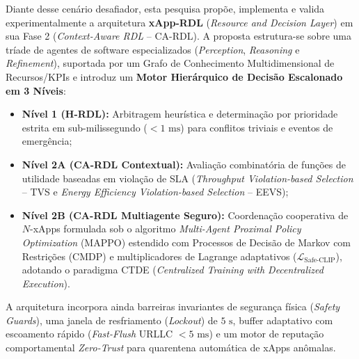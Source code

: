 \documentclass[12pt]{article}
\begin{document}
Diante desse cenário desafiador, esta pesquisa propõe, implementa e valida experimentalmente a arquitetura \textbf{xApp-RDL} (\textit{Resource and Decision Layer}) em sua Fase 2 (\textit{Context-Aware RDL} -- CA-RDL). A proposta estrutura-se sobre uma tríade de agentes de software especializados (\textit{Perception}, \textit{Reasoning} e \textit{Refinement}), suportada por um Grafo de Conhecimento Multidimensional de Recursos/KPIs e introduz um \textbf{Motor Hierárquico de Decisão Escalonado em 3 Níveis}:
\begin{itemize}
    \item \textbf{Nível 1 (H-RDL):} Arbitragem heurística e determinação por prioridade estrita em sub-milissegundo ($<1\text{ ms}$) para conflitos triviais e eventos de emergência;
    \item \textbf{Nível 2A (CA-RDL Contextual):} Avaliação combinatória de funções de utilidade baseadas em violação de SLA (\textit{Throughput Violation-based Selection} -- TVS e \textit{Energy Efficiency Violation-based Selection} -- EEVS);
    \item \textbf{Nível 2B (CA-RDL Multiagente Seguro):} Coordenação cooperativa de $N$-xApps formulada sob o algoritmo \textit{Multi-Agent Proximal Policy Optimization} (MAPPO) \cite{yu2022mappo} estendido com Processos de Decisão de Markov com Restrições (CMDP) \cite{altman1999cmdp} e multiplicadores de Lagrange adaptativos ($\mathcal{L}_{\text{Safe-CLIP}}$), adotando o paradigma CTDE (\textit{Centralized Training with Decentralized Execution}).
\end{itemize}

A arquitetura incorpora ainda barreiras invariantes de segurança física (\textit{Safety Guards}), uma janela de resfriamento (\textit{Lockout}) de $5\text{ s}$, buffer adaptativo com escoamento rápido (\textit{Fast-Flush} URLLC $<5\text{ ms}$) e um motor de reputação comportamental \textit{Zero-Trust} para quarentena automática de xApps anômalas.
\end{document}
